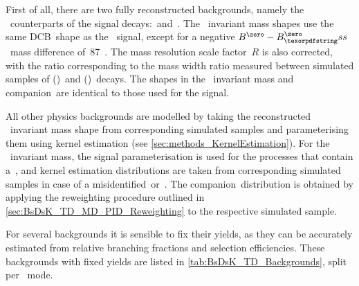 First of all, there are two fully reconstructed backgrounds, namely the \Bd~counterparts of the signal decays:~\BdDsPi and~\BdDsK.
The \Bs~invariant mass shapes use the same DCB~shape as the \Bs~signal, except for a negative \({\Bd-\Bs}\)~mass difference of~\SI{87}{\MeVcc}~\cite{PDG}.
The mass resolution scale factor~\(R\) is also corrected, with the ratio corresponding to the mass width ratio measured between simulated samples of \BdDsPi (\BdDsK)~and \BsDsPi (\BsDsK)~decays.
The shapes in the \Dsmp~invariant mass and companion~\dllkpi are identical to those used for the signal.

All other physics backgrounds are modelled by taking the reconstructed \Bs~invariant mass shape from corresponding simulated samples and parameterising them using kernel estimation (see \cref{sec:methods_KernelEstimation}).
For the \Dsm~invariant mass, the signal parameterisation is used for the processes that contain a~\DsorDssm, and kernel estimation distributions are taken from corresponding simulated samples in case of a misidentified~\Dm or~\Lc.
The companion~\dllkpi distribution is obtained by applying the reweighting procedure outlined in \cref{sec:BsDsK_TD_MD_PID_Reweighting} to the respective simulated sample.

For several backgrounds it is sensible to fix their yields, as they can be accurately estimated from relative branching fractions and selection efficiencies.
These backgrounds with fixed yields are listed in \cref{tab:BsDsK_TD_Backgrounds}, split per \Dsm~mode.

